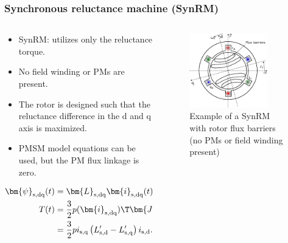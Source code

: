 \begin{frame}
	\frametitle{Synchronous reluctance machine (SynRM)}	
    \begin{columns}
		\begin{column}{0.5\textwidth}
			\begin{itemize}
				\item<2-> SynRM: utilizes only the reluctance torque.
				\item<2->  No field winding or PMs are present.
				\item<3-> The rotor is designed such that the reluctance difference in the d and q axis is maximized.
				\item<4-> PMSM model equations can be used, but the PM flux linkage is zero.
			\end{itemize}
			\begin{equation}
				\begin{split}
					\bm{\psi}_\mathrm{s,dq}(t) &= \bm{L}_\mathrm{s,dq}\bm{i}_{\mathrm{s,dq}}(t), \\
					T(t) &= \frac{3}{2} p (\bm{i}_\mathrm{s,dq})\T\bm{J}\bm{\psi}_\mathrm{s,dq}\\ &= \frac{3}{2} p i_\mathrm{s,q} \left(L'_\mathrm{s,d}-L'_\mathrm{s,q}\right)i_\mathrm{s,d}.
				\end{split}
			\end{equation}
		\end{column}
        \begin{column}{0.5\textwidth}
			\onslide<1->
            \begin{figure}
                \centering
                \includegraphics[width=0.8\textwidth]{fig/lec07/SynRM.pdf}
                \caption{Example of a SynRM with rotor flux barriers (no PMs or field winding present)}
                \label{fig:SynRM}
            \end{figure}
        \end{column}
    \end{columns}
\end{frame}

